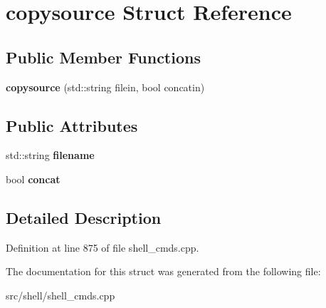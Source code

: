 \hypertarget{structcopysource}{\section{copysource Struct Reference}
\label{structcopysource}
}
\subsection*{Public Member Functions}
\begin{DoxyCompactItemize}
\item 
\hypertarget{structcopysource_a331ce01a5535122b9d07a69019377fef}{{\bfseries copysource} (std\-::string filein, bool concatin)}\label{structcopysource_a331ce01a5535122b9d07a69019377fef}

\end{DoxyCompactItemize}
\subsection*{Public Attributes}
\begin{DoxyCompactItemize}
\item 
\hypertarget{structcopysource_a53465278c86308205dd85bcb4277773d}{std\-::string {\bfseries filename}}\label{structcopysource_a53465278c86308205dd85bcb4277773d}

\item 
\hypertarget{structcopysource_afc69446550cf7febabeeba26122b0e84}{bool {\bfseries concat}}\label{structcopysource_afc69446550cf7febabeeba26122b0e84}

\end{DoxyCompactItemize}


\subsection{Detailed Description}


Definition at line 875 of file shell\-\_\-cmds.\-cpp.



The documentation for this struct was generated from the following file\-:\begin{DoxyCompactItemize}
\item 
src/shell/shell\-\_\-cmds.\-cpp\end{DoxyCompactItemize}
